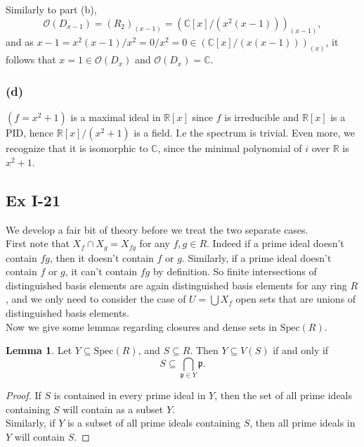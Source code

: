 \documentclass{article}
\theoremstyle{definition}
\newtheorem{lemma}[theorem]{Lemma}
\newcommand{\R}{\mathbb{R}}
\newcommand{\C}{\mathbb{C}}
\newcommand{\Spec}{\text{Spec}}
\begin{document}
Similarly to part (b), 
\[
	\mathcal{O}(D_{x - 1}) 
	= 
	(R_2)_{(x - 1)}  
	=
	(\C[x]/(x^2(x-1)))_{(x - 1)},
\] 
and as $x - 1 = x^2(x - 1)/x^2 = 0/x^2 = 0 \in (\C[x]/(x(x-1)))_{(x)}$, it follows that 
$x = 1 \in \mathcal{O}(D_{x})$ and $\mathcal{O}(D_{x}) = \C$. 

\subsubsection*{(d)}

$(f = x^2 + 1)$ is a maximal ideal in $\R[x]$ since $f$ is irreducible and
$\R[x]$ is a PID, hence $\R[x]/(x^2 + 1)$ is a field. I.e the spectrum is
trivial. Even more, we recognize that it is isomorphic to $\C$, since the
minimal polynomial of $i$ over $\R$ is $x^2 + 1$. \\


\subsection*{Ex I-21}

We develop a fair bit of theory before we treat the two separate cases. \\

First note that $X_f \cap X_g = X_{fg}$ for any $f, g \in R$. Indeed if a prime
ideal doesn't contain $fg$, then it doesn't contain $f$ or $g$. Similarly, if a
prime ideal doesn't contain $f$ or $g$, it can't contain $fg$ by definition. So
finite intersections of distinguished basis elements are again distinguished
basis elements for any ring $R$, and we only need to consider the case of $U =
\bigcup X_f$ open sets that are unions of distinguished basis elements. \\

Now we give some lemmas regarding closures and dense sets in $\Spec(R)$. 

\begin{lemma}
	Let $Y \subseteq \Spec(R)$, and $S \subseteq R$. Then $Y \subseteq V(S)$ if
	and only if
	\[
		S
		\subseteq
		\bigcap_{\mathfrak{p} \in Y} \mathfrak{p}.
	\] 
\end{lemma}
\begin{proof}
	If $S$ is contained in every prime ideal in $Y$, then the set of all prime
	ideals containing $S$ will contain as a subset $Y$. \\

	Similarly, if $Y$ is a subset of all prime ideals containing $S$, then all
	prime ideals in $Y$ will contain $S$.
\end{proof}
\end{document}
